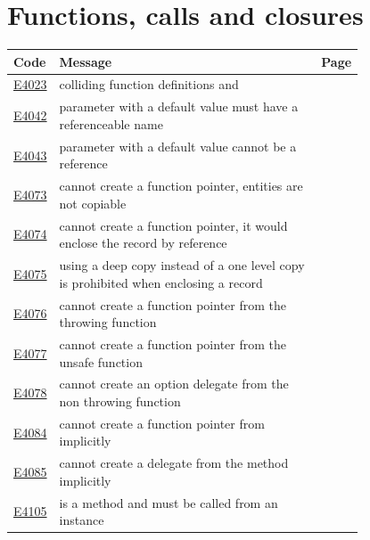 
\clearpage
\section{Functions, calls and closures}
\label{sec:codes:functions}

\begin{longtable}{@{}l p{0.78\linewidth} r@{}}
\toprule Code & Message & Page\\ \midrule \endhead
\hyperref[sec:codes:e4023]{E4023} & colliding function definitions \errhole{} and \errhole{} & \pageref{sec:codes:e4023}\\
\hyperref[sec:codes:e4042]{E4042} & parameter with a default value must have a referenceable name & \pageref{sec:codes:e4042}\\
\hyperref[sec:codes:e4043]{E4043} & parameter with a default value cannot be a reference & \pageref{sec:codes:e4043}\\
\hyperref[sec:codes:e4073]{E4073} & cannot create a function pointer, entities are not copiable & \pageref{sec:codes:e4073}\\
\hyperref[sec:codes:e4074]{E4074} & cannot create a function pointer, it would enclose the record by reference & \pageref{sec:codes:e4074}\\
\hyperref[sec:codes:e4075]{E4075} & using a deep copy instead of a one level copy is prohibited when enclosing a record & \pageref{sec:codes:e4075}\\
\hyperref[sec:codes:e4076]{E4076} & cannot create a function pointer from the throwing function \errhole{} & \pageref{sec:codes:e4076}\\
\hyperref[sec:codes:e4077]{E4077} & cannot create a function pointer from the unsafe function \errhole{} & \pageref{sec:codes:e4077}\\
\hyperref[sec:codes:e4078]{E4078} & cannot create an option delegate from the non throwing function \errhole{} & \pageref{sec:codes:e4078}\\
\hyperref[sec:codes:e4084]{E4084} & cannot create a function pointer from \errhole{} implicitly & \pageref{sec:codes:e4084}\\
\hyperref[sec:codes:e4085]{E4085} & cannot create a delegate from the method \errhole{} implicitly & \pageref{sec:codes:e4085}\\
\hyperref[sec:codes:e4105]{E4105} & \errhole{} is a method and must be called from an instance & \pageref{sec:codes:e4105}\\

\end{longtable}
